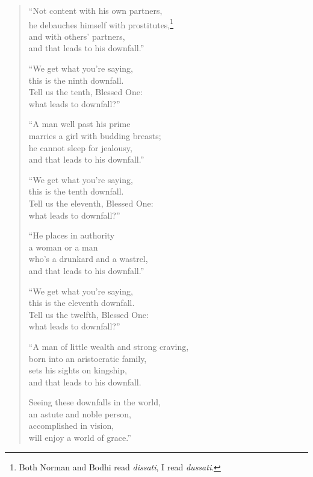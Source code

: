 \documentclass[12pt,openany]{book}%
\begin{document}
\begin{verse}
“Not content with his own partners, \\
he debauches himself with prostitutes,\footnote{Both Norman and Bodhi read \textit{dissati}, I read \textit{dussati}. } \\
and with others’ partners, \\
and that leads to his downfall.” 

“We get what you’re saying, \\
this is the ninth downfall. \\
Tell us the tenth, Blessed One: \\
what leads to downfall?” 

“A man well past his prime \\
marries a girl with budding breasts; \\
he cannot sleep for jealousy, \\
and that leads to his downfall.” 

“We get what you’re saying, \\
this is the tenth downfall. \\
Tell us the eleventh, Blessed One: \\
what leads to downfall?” 

“He places in authority \\
a woman or a man \\
who’s a drunkard and a wastrel, \\
and that leads to his downfall.” 

“We get what you’re saying, \\
this is the eleventh downfall. \\
Tell us the twelfth, Blessed One: \\
what leads to downfall?” 

“A man of little wealth and strong craving, \\
born into an aristocratic family, \\
sets his sights on kingship, \\
and that leads to his downfall. 

Seeing these downfalls in the world, \\
an astute and noble person, \\
accomplished in vision, \\
will enjoy a world of grace.” 

%
\end{verse}
\end{document}

